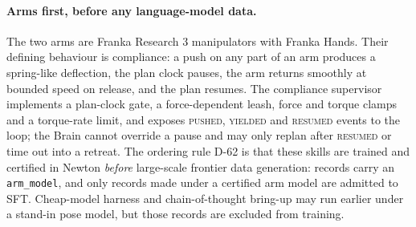 \paragraph{Arms first, before any language-model data.}
The two arms are Franka Research 3 manipulators with Franka Hands.
Their defining behaviour is compliance: a push on any part of an arm produces a spring-like deflection, the plan clock pauses, the arm returns smoothly at bounded speed on release, and the plan resumes.
The compliance supervisor implements a plan-clock gate, a force-dependent leash, force and torque clamps and a torque-rate limit, and exposes \textsc{pushed}, \textsc{yielded} and \textsc{resumed} events to the loop; the Brain cannot override a pause and may only replan after \textsc{resumed} or time out into a retreat.
The ordering rule D-62 is that these skills are trained and certified in Newton \emph{before} large-scale frontier data generation: records carry an \texttt{arm\_model}, and only records made under a certified arm model are admitted to SFT.
Cheap-model harness and chain-of-thought bring-up may run earlier under a stand-in pose model, but those records are excluded from training.

